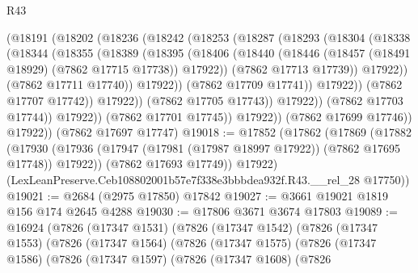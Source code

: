 \begin{lexlean}{R43}
\begin{coremodule}
                        (@18191
                          (@18202
                            (@18236
                              (@18242
                                (@18253
                                  (@18287
                                    (@18293
                                      (@18304
                                        (@18338
                                          (@18344
                                            (@18355
                                              (@18389
                                                (@18395
                                                  (@18406
                                                    (@18440
                                                      (@18446
                                                        (@18457
                                                          (@18491 @18929)
                                                          (@7862 @17715 @17738))
                                                        @17922))
                                                    (@7862 @17713 @17739))
                                                  @17922))
                                              (@7862 @17711 @17740))
                                            @17922))
                                        (@7862 @17709 @17741))
                                      @17922))
                                  (@7862 @17707 @17742))
                                @17922))
                            (@7862 @17705 @17743))
                          @17922))
                      (@7862 @17703 @17744))
                    @17922))
                (@7862 @17701 @17745))
              @17922))
          (@7862 @17699 @17746))
        @17922))
    (@7862 @17697 @17747)
@19018 := @17852
    (@17862
      (@17869
        (@17882
          (@17930 (@17936 (@17947 (@17981 (@17987 @18997 @17922)) (@7862 @17695 @17748)) @17922))
          (@7862 @17693 @17749))
        @17922)
      (LexLeanPreserve.Ceb108802001b57e7f338e3bbbdea932f.R43.__rel_28 @17750))
@19021 := @2684 (@2975 @17850) @17842
@19027 := @3661 @19021 @1819 @156 @174 @2645 @4288
@19030 := @17806 @3671 @3674 @17803
@19089 := @16924
    (@7826
      (@17347 @1531)
      (@7826
        (@17347 @1542)
        (@7826
          (@17347 @1553)
          (@7826
            (@17347 @1564)
            (@7826
              (@17347 @1575)
              (@7826
                (@17347 @1586)
                (@7826
                  (@17347 @1597)
                  (@7826
                    (@17347 @1608)
                    (@7826

\end{coremodule}
\end{lexlean}
